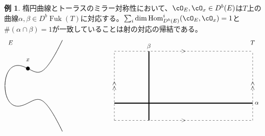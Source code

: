 \documentclass[uplatex,a4paper,dvipdfmx]{jsarticle}
\numberwithin{equation}{section}
\theoremstyle{definition}
\newtheorem{example}[theorem]{例}
\DeclareMathOperator{\Hom}{\mathrm{Hom}}
\DeclareMathOperator{\Fuk}{Fuk}
\begin{document}
\begin{example}
	楕円曲線とトーラスのミラー対称性において、$\cO_E, \cO_x \in D^b(E)$は$T$上の曲線$\alpha, \beta \in D^b \Fuk(T)$に対応する。$\sum_i \dim \Hom_{D^b(E)}^i(\cO_E, \cO_x)=1$と$\# (\alpha \cap \beta) = 1$が一致していることは射の対応の帰結である。
	\begin{displaymath}
		\begin{tikzpicture}[samples=300]
			\draw(-1, 2.5) node{$E$};
			\draw[thick,domain=-1.3247:2] plot(\x,{sqrt(\x^3-\x+1)});
			\draw[thick,domain=-1.3247:2] plot(\x,{-sqrt(\x^3-\x+1)});

			\filldraw[black] (0, 1) circle (3pt);
			\draw(0, 1.3) node[above]{$x$};

			\draw(13, 2.5) node{$T$};
			\draw[dashed] (5,-2)--(13,-2);
			\draw(9, -2) node{$>$};
			\draw[dashed] (5,2)--(13,2);
			\draw(9, 2) node{$>$};


			\draw[dashed] (5,-2)--(5,2);
			\draw(5, 0) node{\rotatebox{90}{$>>$}};
			\draw[dashed] (13,-2)--(13,2);
			\draw(13, 0) node{\rotatebox{90}{$>>$}};


			\draw[ultra thick] (5, -1)--(13, -1);
			\draw(13, -1) node[right]{$\alpha$};


			\draw[ultra thick] (7, -2)--(7, 2);
			\draw(7, 2) node[above]{$\beta$};
		\end{tikzpicture}
		\begin{tikzpicture}[scale=0.5]

		\end{tikzpicture}
	\end{displaymath}
\end{example}
\end{document}
